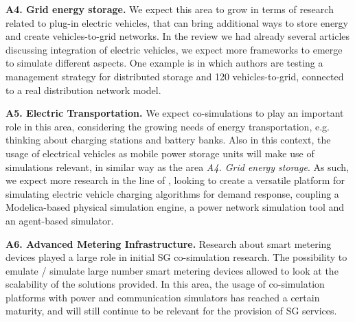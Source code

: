 \documentclass[1p]{elsarticle} %
\newcommand*{\todo}{\textcolor{red}}
\begin{document}
\noindent \textbf{A4. Grid energy storage.} We expect this area to grow in terms of research related to plug-in electric vehicles, that can bring additional ways to store energy and create vehicles-to-grid networks. In the review we had already several articles discussing integration of electric vehicles, we expect more frameworks to emerge to simulate different aspects. One example is  in which authors are testing a management strategy for distributed storage and 120 vehicles-to-grid, connected to a real distribution network model.



\noindent \textbf{A5. Electric Transportation.} We expect co-simulations to play an important role in this area, considering the growing needs of energy transportation, e.g. thinking about charging stations and battery banks. Also in this context, the usage of electrical vehicles as mobile power storage units will make use of simulations relevant, in similar way as the area \textit{A4. Grid energy storage}. As such, we expect more research in the line of  , looking to create a versatile platform for simulating
electric vehicle charging algorithms for demand response, coupling a Modelica-based physical simulation engine, a power network simulation tool and an agent-based simulator.




\noindent \textbf{A6. Advanced Metering Infrastructure.}  Research about smart metering devices played a large role in initial SG co-simulation research. The possibility to emulate / simulate large number smart metering devices allowed to look at the scalability of the solutions provided. In this area, the usage of co-simulation platforms with power and communication simulators has reached a certain maturity, and will still continue to be relevant for the provision of SG services.
\end{document}
